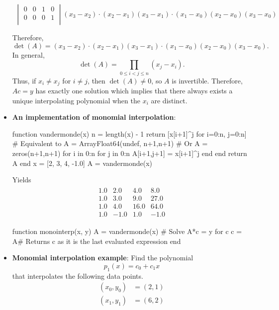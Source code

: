 \documentclass{report}
\begin{document}
\begin{itemize}
$$\begin{align}
\begin{vmatrix}
0 & 0 & 1 & 0 \\
0 & 0 & 0 & 1 \\
\end{vmatrix} (x_3-x_2)\cdot(x_2-x_1)(x_3-x_1)\cdot(x_1-x_0)(x_2-x_0)(x_3-x_0) \\ \\
\end{align}
$$
Therefore, 
$$\det(A) = (x_3-x_2)\cdot(x_2-x_1)(x_3-x_1)\cdot(x_1-x_0)(x_2-x_0)(x_3-x_0).$$
\bigbreak \noindent 
In general,
$$\det(A) = \prod_{0\leq i < j \leq n} (x_j - x_i).$$
Thus, if $x_i \neq x_j$ for $i \neq j$, then $\det(A) \neq 0$, so $A$ is invertible. Therefore, $Ac = y$ has exactly one solution which implies that there always exists a unique interpolating polynomial when the $x_i$ are distinct.
\item \textbf{An implementation of monomial interpolation}:
    \bigbreak \noindent 
    \begin{jlcode}
function vandermonde(x)
    n = length(x) - 1
    return [x[i+1]^j for i=0:n, j=0:n]
    # Equivalent to 
    A = Array{Float64}(undef, n+1,n+1)
    # Or A = zeros(n+1,n+1)
    for i in 0:n
        for j in 0:n
            A[i+1,j+1] = x[i+1]^j
        end
    end
    return A
end
x = [2, 3, 4, -1.0]
A = vandermonde(x)
    \end{jlcode}
    \bigbreak \noindent 
    Yields
    \bigbreak \noindent 
    \begin{align*}
        \begin{array}{cccc}
            1.0   &2.0   &4.0   &8.0 \\
            1.0   &3.0   &9.0  &27.0 \\
            1.0   &4.0  &16.0 & 64.0 \\
            1.0  &-1.0   &1.0 & -1.0
        \end{array}
    \end{align*}
    \bigbreak \noindent 
    \begin{jlcode}
function monointerp(x, y)
    A = vandermonde(x)
    # Solve A*c = y for c
    c = A\y # Returns c as it is the last evaluated expression
end
    \end{jlcode}
    \bigbreak \noindent 
\item \textbf{Monomial interpolation example}:
    Find the polynomial
$$p_1(x) = c_0 + c_1 x$$
that interpolates the following data points.
\begin{align*}
    (x_0,y_0) &= (2,1)\\
    (x_1,y_1) &= (6,2)\\

\end{align*}
\end{itemize}
\end{document}
